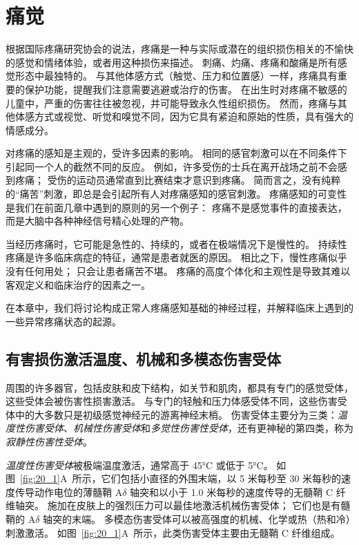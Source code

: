 \chapter{痛觉} \label{chap:chap20}

根据国际疼痛研究协会的说法，疼痛是一种与实际或潜在的组织损伤相关的不愉快的感觉和情绪体验，或者用这种损伤来描述。
刺痛、灼痛、疼痛和酸痛是所有感觉形态中最独特的。
与其他体感方式（触觉、压力和位置感）一样，疼痛具有重要的保护功能，提醒我们注意需要逃避或治疗的伤害。 
在出生时对疼痛不敏感的儿童中，严重的伤害往往被忽视，并可能导致永久性组织损伤。
然而，疼痛与其他体感方式或视觉、听觉和嗅觉不同，因为它具有紧迫和原始的性质，具有强大的情感成分。







对疼痛的感知是主观的，受许多因素的影响。
相同的感官刺激可以在不同条件下引起同一个人的截然不同的反应。
例如，许多受伤的士兵在离开战场之前不会感到疼痛；
受伤的运动员通常直到比赛结束才意识到疼痛。
简而言之，没有纯粹的“痛苦”刺激，即总是会引起所有人对疼痛感知的感官刺激。
疼痛感知的可变性是我们在前面几章中遇到的原则的另一个例子：
疼痛不是感觉事件的直接表达，而是大脑中各种神经信号精心处理的产物。


当经历疼痛时，它可能是急性的、持续的，或者在极端情况下是慢性的。
持续性疼痛是许多临床病症的特征，通常是患者就医的原因。
相比之下，慢性疼痛似乎没有任何用处；
只会让患者痛苦不堪。
疼痛的高度个体化和主观性是导致其难以客观定义和临床治疗的因素之一。


在本章中，我们将讨论构成正常人疼痛感知基础的神经过程，并解释临床上遇到的一些异常疼痛状态的起源。



\section{有害损伤激活温度、机械和多模态伤害受体}

周围的许多器官，包括皮肤和皮下结构，如关节和肌肉，都具有专门的感觉受体，这些受体会被伤害性损害激活。
与专门的轻触和压力体感受体不同，这些伤害受体中的大多数只是初级感觉神经元的游离神经末梢。
伤害受体主要分为三类：\textit{温度性伤害受体}、\textit{机械性伤害受体}和\textit{多觉性伤害性受体}，还有更神秘的第四类，称为\textit{寂静性伤害性受体}。


\textit{温度性伤害受体}被极端温度激活，通常高于 45°C 或低于 5°C。
如图~\ref{fig:20_1}A~所示，它们包括小直径的外围末端，以 5 米每秒至 30 米每秒的速度传导动作电位的薄髓鞘 A$\delta$ 轴突和以小于 1.0 米每秒的速度传导的无髓鞘 C 纤维轴突。
施加在皮肤上的强烈压力可以最佳地激活机械伤害受体；
它们也是有髓鞘的 A$\delta$ 轴突的末端。
多模态伤害受体可以被高强度的机械、化学或热（热和冷）刺激激活。
如图~\ref{fig:20_1}A~所示，此类伤害受体主要由无髓鞘 C 纤维组成。


